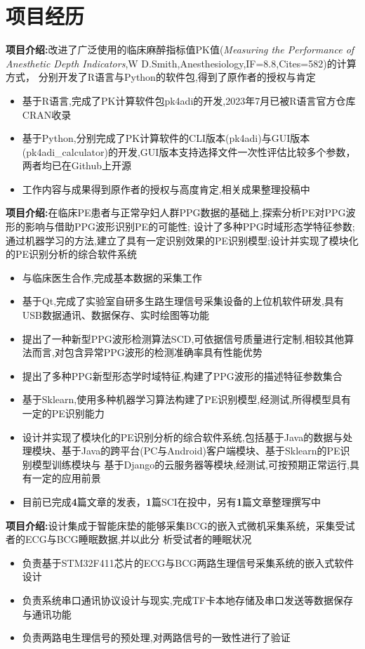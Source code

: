 \documentclass{resume}
\begin{document}
\section{项目经历}
\textbf{项目介绍:}改进了广泛使用的临床麻醉指标值PK值(\textit{Measuring the Performance of Anesthetic Depth Indicators},W D.Smith,Anesthesiology,IF=8.8,Cites=582)的计算方式，
分别开发了R语言与Python的软件包,得到了原作者的授权与肯定
\begin{itemize}
    \item 基于R语言,完成了PK计算软件包pk4adi的开发,2023年7月已被R语言官方仓库CRAN收录
    \item 基于Python,分别完成了PK计算软件的CLI版本(pk4adi)与GUI版本(pk4adi\_calculator)的开发,GUI版本支持选择文件一次性评估比较多个参数，两者均已在Github上开源
    \item 工作内容与成果得到原作者的授权与高度肯定,相关成果整理投稿中
\end{itemize}
\textbf{项目介绍:}在临床PE患者与正常孕妇人群PPG数据的基础上,探索分析PE对PPG波形的影响与借助PPG波形识别PE的可能性;
设计了多种PPG时域形态学特征参数;通过机器学习的方法,建立了具有一定识别效果的PE识别模型;设计并实现了模块化的PE识别分析的综合软件系统
\begin{itemize}
  \item 与临床医生合作,完成基本数据的采集工作
  \item 基于Qt,完成了实验室自研多生路生理信号采集设备的上位机软件研发,具有USB数据通讯、数据保存、实时绘图等功能
  \item 提出了一种新型PPG波形检测算法SCD,可依据信号质量进行定制,相较其他算法而言,对包含异常PPG波形的检测准确率具有性能优势
  \item 提出了多种PPG新型形态学时域特征,构建了PPG波形的描述特征参数集合
  \item 基于Sklearn,使用多种机器学习算法构建了PE识别模型,经测试,所得模型具有一定的PE识别能力
  \item 设计并实现了模块化的PE识别分析的综合软件系统,包括基于Java的数据与处理模块、基于Java的跨平台(PC与Android)客户端模块、基于Sklearn的PE识别模型训练模块与
  基于Django的云服务器等模块,经测试,可按预期正常运行,具有一定的应用前景
  \item 目前已完成\textbf{4}篇文章的发表，\textbf{1}篇SCI在投中，另有\textbf{1}篇文章整理撰写中
\end{itemize}
\textbf{项目介绍:}设计集成于智能床垫的能够采集BCG的嵌入式微机采集系统，采集受试者的ECG与BCG睡眠数据,并以此分
析受试者的睡眠状况
\begin{itemize}
  \item 负责基于STM32F411芯片的ECG与BCG两路生理信号采集系统的嵌入式软件设计
  \item 负责系统串口通讯协议设计与现实,完成TF卡本地存储及串口发送等数据保存与通讯功能
  \item 负责两路电生理信号的预处理,对两路信号的一致性进行了验证
\end{itemize}
\end{document}
